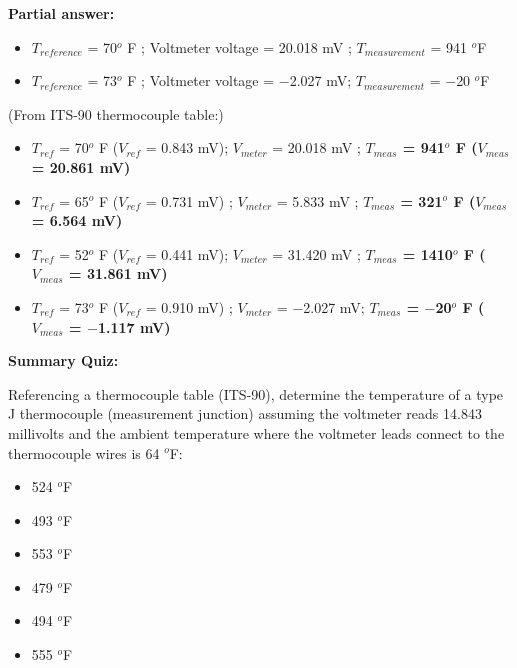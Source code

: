 
\noindent
{\bf Partial answer:}

\begin{itemize}
\item{} $T_{reference}$ = 70$^{o}$ F ; Voltmeter voltage = 20.018 mV ; $T_{measurement}$ = 941 $^{o}$F 
\item{} $T_{reference}$ = 73$^{o}$ F ; Voltmeter voltage = $-$2.027 mV; $T_{measurement}$ = $-$20 $^{o}$F 
\end{itemize}







(From ITS-90 thermocouple table:)

\begin{itemize}
\item{} $T_{ref}$ = 70$^{o}$ F ($V_{ref}$ = 0.843 mV); $V_{meter}$ = 20.018 mV ; {\bf $T_{meas}$ = 941$^{o}$ F ($V_{meas}$ = 20.861 mV)}
\item{} $T_{ref}$ = 65$^{o}$ F ($V_{ref}$ = 0.731 mV) ; $V_{meter}$ = 5.833 mV ; {\bf $T_{meas}$ = 321$^{o}$ F ($V_{meas}$ = 6.564 mV)}
\item{} $T_{ref}$ = 52$^{o}$ F ($V_{ref}$ = 0.441 mV); $V_{meter}$ = 31.420 mV ; {\bf $T_{meas}$ = 1410$^{o}$ F ($V_{meas}$ = 31.861 mV)}
\item{} $T_{ref}$ = 73$^{o}$ F ($V_{ref}$ = 0.910 mV) ; $V_{meter}$ = $-$2.027 mV; {\bf $T_{meas}$ = $-$20$^{o}$ F ($V_{meas}$ = $-$1.117 mV)}
\end{itemize}







\vfil \eject

\noindent
{\bf Summary Quiz:}

Referencing a thermocouple table (ITS-90), determine the temperature of a type J thermocouple (measurement junction) assuming the voltmeter reads 14.843 millivolts and the ambient temperature where the voltmeter leads connect to the thermocouple wires is 64 $^{o}$F:

\begin{itemize}
\item{} 524 $^{o}$F
\vskip 5pt 
\item{} 493 $^{o}$F
\vskip 5pt 
\item{} 553 $^{o}$F 
\vskip 5pt 
\item{} 479 $^{o}$F
\vskip 5pt 
\item{} 494 $^{o}$F
\vskip 5pt 
\item{} 555 $^{o}$F
\end{itemize}





